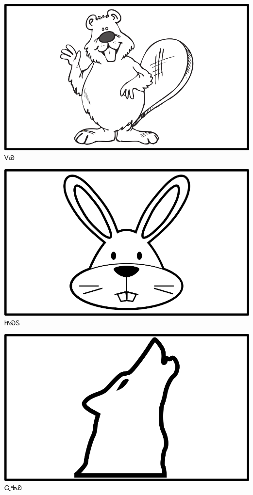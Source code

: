 \documentclass[avery5371]{flashcards}%
\begin{document}
    \begin{flashcard}{
        \includegraphics[width=0.95\columnwidth,height=.51\columnwidth,keepaspectratio]{../artwork/objects-animate/doya}
    }
        \Huge ᏙᏯ
    \end{flashcard}

    \begin{flashcard}{
        \includegraphics[width=0.95\columnwidth,height=.51\columnwidth,keepaspectratio]{../artwork/objects-animate/jisdu}
    }
        \Huge ᏥᏍᏚ
    \end{flashcard}
    \begin{flashcard}{
        \includegraphics[width=0.95\columnwidth,height=.51\columnwidth,keepaspectratio]{../artwork/objects-animate/wahya}
    }
        \Huge ᏩᎭᏯ
    \end{flashcard}
\end{document}

